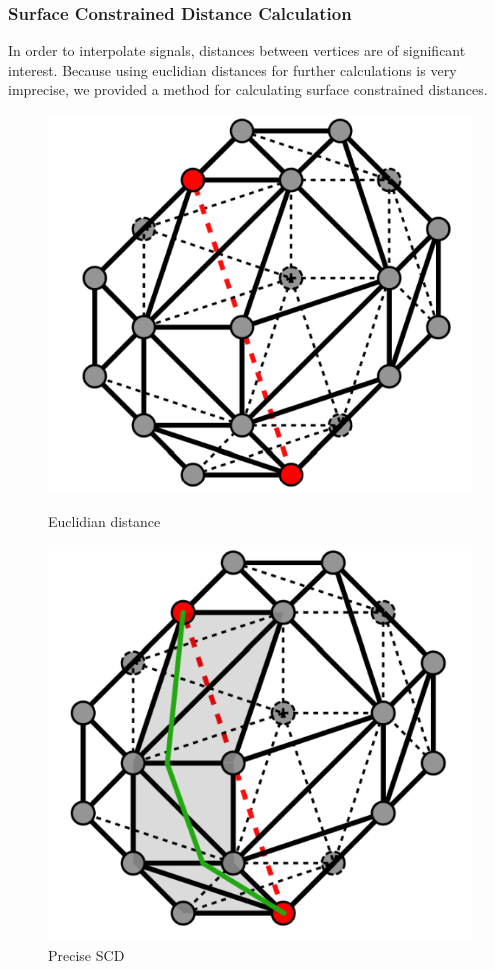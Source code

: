 \subsubsection{Surface Constrained Distance Calculation}

In order to interpolate signals, distances between vertices are of significant interest. Because using euclidian distances for further calculations is very imprecise, we provided a method for calculating surface constrained distances.

\begin{figure}[h]
	\centering
	\begin{minipage}[b]{0.46\textwidth}
		\includegraphics[width=\textwidth]{figures/scdcEuclid.png}
		\caption{Euclidian distance}
	\end{minipage}
	\hfill
	\begin{minipage}[b]{0.46\textwidth}
		\includegraphics[width=\textwidth]{figures/scdcPrecise.png}
		\caption{Precise SCD}
	\end{minipage}
\end{figure}


\clearpage



  

